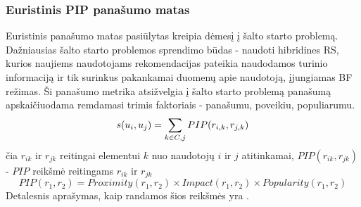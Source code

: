\documentclass{VUMIFInfMagistrinis}
\begin{document}
\subsubsection{Euristinis PIP panašumo matas}
Euristinis panašumo matas pasiūlytas \cite{7} kreipia dėmesį į šalto starto problemą. Dažniausias šalto starto problemos sprendimo būdas - naudoti hibridines RS, kurios naujiems naudotojams rekomendacijas pateikia naudodamos turinio informaciją ir tik surinkus pakankamai duomenų apie naudotoją, įjungiamas BF režimas. Ši panašumo metrika atsižvelgia į šalto starto problemą panašumą apskaičiuodama remdamasi trimis faktoriais - panašumu, poveikiu, populiarumu.
\begin{equation}
s(u_i, u_j)= \sum \limits_{k \in C, j}\boldmath{PIP}(r_{i,k}, r_{j,k})
\end{equation}
čia $r_{ik}$ ir $r_{jk}$ reitingai elementui $k$ nuo naudotojų $i$ ir $j$ atitinkamai, $PIP(r_{ik}, r_{jk})$ - $PIP$ reikšmė reitingams $r_{ik}$ ir $r_{jk}$
\begin{equation}
PIP(r_1,r_2) = Proximity(r_1,r_2) \times Impact(r_1,r_2) \times Popularity(r_1,r_2)
\end{equation}
Detalesnis aprašymas, kaip randamos šios reikšmės yra \cite{7}.
\end{document}
